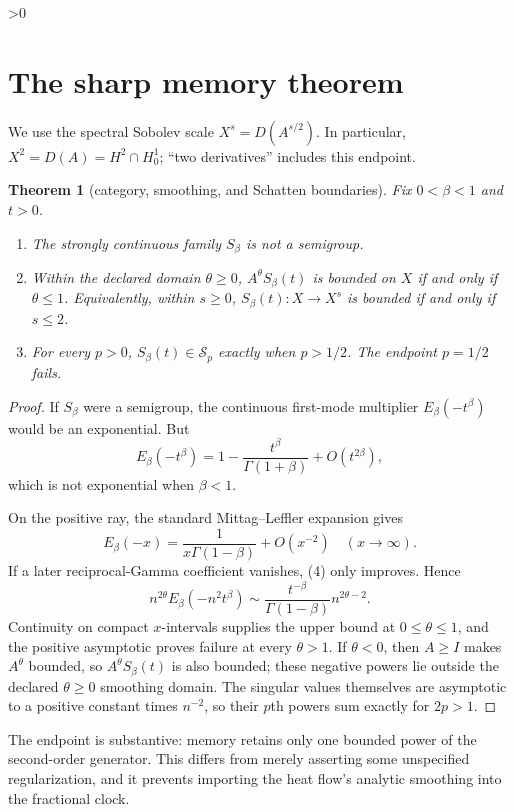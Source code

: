 \documentclass[10pt]{article}
\providecommand{\CRevisionRound}{2}
\newtheorem{theorem}{Theorem}
\begin{document}
\ifnum\CRevisionRound>0
\section{The sharp memory theorem}
We use the spectral Sobolev scale $X^s=D(A^{s/2})$.  In particular,
$X^2=D(A)=H^2\cap H_0^1$; ``two derivatives'' includes this endpoint.

\begin{theorem}[category, smoothing, and Schatten boundaries]
Fix $0<\beta<1$ and $t>0$.
\begin{enumerate}
\item The strongly continuous family $S_\beta$ is not a semigroup.
\item Within the declared domain $\theta\geq0$,
$A^\theta S_\beta(t)$ is bounded on $X$ if and only if $\theta\leq1$.
Equivalently, within $s\geq0$, $S_\beta(t):X\to X^s$ is bounded if and only
if $s\leq2$.
\item For every $p>0$, $S_\beta(t)\in\mathcal S_p$ exactly when $p>1/2$.
The endpoint $p=1/2$ fails.
\end{enumerate}
\end{theorem}
\begin{proof}
If $S_\beta$ were a semigroup, the continuous first-mode multiplier
$E_\beta(-t^\beta)$ would be an exponential.  But
\[
 E_\beta(-t^\beta)=1-\frac{t^\beta}{\Gamma(1+\beta)}
 +O(t^{2\beta}),
\]
which is not exponential when $\beta<1$.

On the positive ray, the standard Mittag--Leffler expansion gives
\begin{equation}
 E_\beta(-x)=\frac1{x\Gamma(1-\beta)}+O(x^{-2})
 \quad(x\to\infty).                                      \tag{4}
\end{equation}
If a later reciprocal-Gamma coefficient vanishes, (4) only improves.  Hence
\[
 n^{2\theta}E_\beta(-n^2t^\beta)
 \sim\frac{t^{-\beta}}{\Gamma(1-\beta)}n^{2\theta-2}.
\]
Continuity on compact $x$-intervals supplies the upper bound at
$0\leq\theta\leq1$, and the positive asymptotic proves failure at every
$\theta>1$.  If $\theta<0$, then $A\geq I$ makes $A^\theta$ bounded, so
$A^\theta S_\beta(t)$ is also bounded; these negative powers lie outside the
declared $\theta\geq0$ smoothing domain.  The singular values themselves are
asymptotic to a positive
constant times $n^{-2}$, so their $p$th powers sum exactly for $2p>1$.
\end{proof}

The endpoint is substantive: memory retains only one bounded power of the
second-order generator.  This differs from merely asserting some unspecified
regularization, and it prevents importing the heat flow's analytic smoothing
into the fractional clock.
\fi
\end{document}
